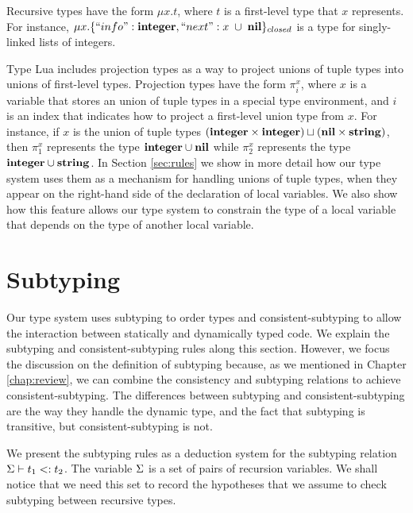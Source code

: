 Recursive types have the form $\mu x.t$,
where $t$ is a first-level type that $x$ represents.
For instance, $\mu x.\{``info":\mathbf{integer}, ``next":x \;\cup\; \mathbf{nil}\}_{closed}$
is a type for singly-linked lists of integers.

Type Lua includes projection types as a way to project
unions of tuple types into unions of first-level types.
Projection types have the form $\pi_{i}^{x}$, where $x$ is a variable
that stores an union of tuple types in a special type environment,
and $i$ is an index that indicates how to project a first-level
union type from $x$.
For instance, if $x$ is the union of tuple types
$(\mathbf{integer} \times \mathbf{integer}) \sqcup (\mathbf{nil} \times \mathbf{string})$,
then $\pi_{1}^{x}$ represents the type $\mathbf{integer} \cup \mathbf{nil}$
while $\pi_{2}^{x}$ represents the type $\mathbf{integer} \cup \mathbf{string}$.
In Section \ref{sec:rules} we show in more detail how our type system
uses them as a mechanism for handling unions of tuple types,
when they appear on the right-hand side of the declaration of local variables.
We also show how this feature allows our type system to constrain
the type of a local variable that depends on the type of another local variable.

\section{Subtyping}
\label{sec:subtyping}

Our type system uses subtyping \citep{cardelli1984smi,abadi1996to} to order
types and consistent-subtyping \citep{siek2007objects,siek2013mutable}
to allow the interaction between statically and dynamically typed code.
We explain the subtyping and consistent-subtyping rules along this section.
However, we focus the discussion on the definition of subtyping because,
as we mentioned in Chapter \ref{chap:review}, we can combine the
consistency and subtyping relations to achieve consistent-subtyping.
The differences between subtyping and consistent-subtyping are the way
they handle the dynamic type, and the fact that subtyping is transitive,
but consistent-subtyping is not.

We present the subtyping rules as a deduction system for the
subtyping relation $\Sigma \vdash t_{1} <: t_{2}$.
The variable $\Sigma$ is a set of pairs of recursion variables.
We shall notice that we need this set to record the hypotheses
that we assume to check subtyping between recursive types.

